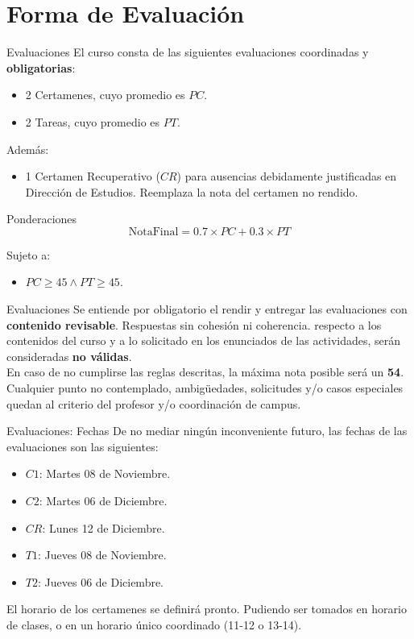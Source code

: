 \documentclass{beamer}
\begin{document}
\section{Forma de Evaluación}
\begin{frame}{Evaluaciones}
El curso consta de las siguientes evaluaciones coordinadas y \textbf{obligatorias}:
\begin{itemize}
\item 2 Certamenes, cuyo promedio es $PC$. 
\item 2 Tareas, cuyo promedio es $PT$. 
\end{itemize}
Además:
\begin{itemize}
\item 1 Certamen Recuperativo ($CR$) para ausencias debidamente justificadas en Dirección de Estudios. Reemplaza la nota del certamen no rendido.
\end{itemize}
\begin{exampleblock}{Ponderaciones}
$$ \text{NotaFinal} = 0.7 \times PC + 0.3 \times PT $$
\end{exampleblock}

Sujeto a: 
\begin{itemize}
\item $PC \geq 45 \land PT \geq 45$.
\end{itemize}
\end{frame}

\begin{frame}{Evaluaciones}
Se entiende por obligatorio el rendir y entregar las evaluaciones con \textbf{contenido revisable}. Respuestas sin cohesión ni coherencia. respecto a los contenidos del curso y a lo solicitado en los enunciados de las actividades, serán consideradas \textbf{no válidas}.\\[1em]

En caso de no cumplirse las reglas descritas, la máxima nota posible será un \textbf{54}.\\[1em]

Cualquier punto no contemplado, ambigüedades, solicitudes y/o casos especiales quedan al criterio del profesor y/o coordinación de campus.
\end{frame}

\begin{frame}{Evaluaciones: Fechas}
De no mediar ningún inconveniente futuro, las fechas de las evaluaciones son las siguientes:
\begin{itemize}
\item $C1$: Martes 08 de Noviembre.
\item $C2$: Martes 06 de Diciembre.
\item $CR$: Lunes 12 de Diciembre.\bigskip
\item $T1$: Jueves 08 de Noviembre.
\item $T2$: Jueves 06 de Diciembre. 
\end{itemize}

El horario de los certamenes se definirá pronto. Pudiendo ser tomados en horario de clases, o en un horario único coordinado (11-12 o 13-14). 
\end{frame}
\end{document}

